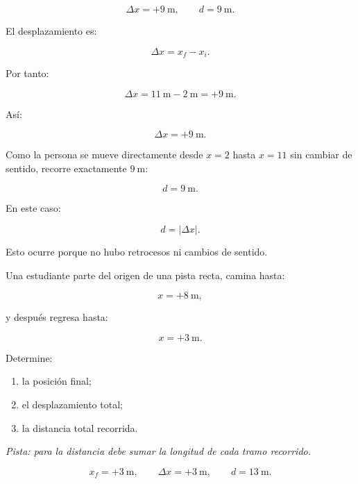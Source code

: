 \begin{respuesta}
\[
\Delta x=+\SI{9}{\meter},
\qquad
d=\SI{9}{\meter}.
\]
\end{respuesta}

\begin{explicacion}
El desplazamiento es:

\[ \Delta x=x_f-x_i. \]

Por tanto:

\[
\Delta x
=
\SI{11}{\meter}
-
\SI{2}{\meter}
=
+\SI{9}{\meter}.
\]

Así:

\[ \boxed{\Delta x=+\SI{9}{\meter}}. \]

Como la persona se mueve directamente desde \(x=2\) hasta \(x=11\) sin cambiar de sentido, recorre exactamente \(\SI{9}{\meter}\):

\[ \boxed{d=\SI{9}{\meter}}. \]

En este caso:

\[ d=|\Delta x|. \]

Esto ocurre porque no hubo retrocesos ni cambios de sentido.
\end{explicacion}


\begin{ejercicio}
Una estudiante parte del origen de una pista recta, camina hasta:

\[ x=+\SI{8}{\meter}, \]

y después regresa hasta:

\[ x=+\SI{3}{\meter}. \]

Determine:

\begin{enumerate}[label=\alph*)]
    \item la posición final;
    \item el desplazamiento total;
    \item la distancia total recorrida.
\end{enumerate}

\textit{Pista: para la distancia debe sumar la longitud de cada tramo recorrido.}
\end{ejercicio}

\begin{respuesta}
\[
x_f=+\SI{3}{\meter},
\qquad
\Delta x=+\SI{3}{\meter},
\qquad
d=\SI{13}{\meter}.
\]
\end{respuesta}

